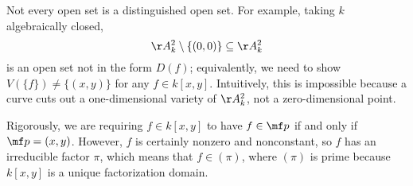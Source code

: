 \documentclass[../notes.tex]{subfiles}
\begin{document}
\begin{remark}
	Not every open set is a distinguished open set. For example, taking $k$ algebraically closed,
	\[\AA^2_k\setminus\{(0,0)\}\subseteq\AA^2_k\]
	is an open set not in the form $D(f)$; equivalently, we need to show $V(\{f\})\ne\{(x,y)\}$ for any $f\in k[x,y]$. Intuitively, this is impossible because a curve cuts out a one-dimensional variety of $\AA^2_k$, not a zero-dimensional point.
	
	Rigorously, we are requiring $f\in k[x,y]$ to have $f\in\mf p$ if and only if $\mf p=(x,y)$. However, $f$ is certainly nonzero and nonconstant, so $f$ has an irreducible factor $\pi$, which means that $f\in(\pi)$, where $(\pi)$ is prime because $k[x,y]$ is a unique factorization domain.
\end{remark}
\end{document}
